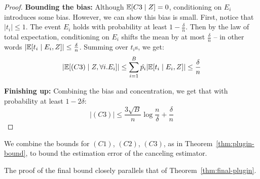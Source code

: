 \begin{proof}
\textbf{Bounding the bias:} Although $\mathbb{E}[C3 \mid Z] = 0$, conditioning on $E_i$ introduces some bias.
However, we can show this bias is small. First, notice that $|t_i| \leq 1$. The event $E_i$ holds with probability at least $1 - \frac{\delta}{n}$. Then by the law of total expectation, conditioning on $E_i$ shifts the mean by at most $\frac{\delta}{n}$ -- in other words $|\mathbb{E}[t_i \mid E_i, Z]| \leq \frac{\delta}{n}$.
Summing over $t_i$s, we get:
\[ \lvert \mathbb{E}[(C3) \mid Z, \forall i. E_i] \rvert \leq \sum_{i=1}^B \hat{p_i} \lvert \mathbb{E}[t_i \mid E_i, Z] \rvert \leq \frac{\delta}{n} \]

\textbf{Finishing up:} Combining the bias and concentration, we get that with probability at least $1 - 2\delta$:
\[ |(C3)| \leq \frac{3\sqrt{B}}{n} \log{\frac{n}{\delta}} + \frac{\delta}{n}\]

\end{proof}

We combine the bounds for $(C1)$, $(C2)$, $(C3)$, as in Theorem~\ref{thm:plugin-bound}, to bound the estimation error of the canceling estimator.

\cancelingBound*

The proof of the final bound closely parallels that of Theorem~\ref{thm:final-plugin}.

\finalCanceling*
